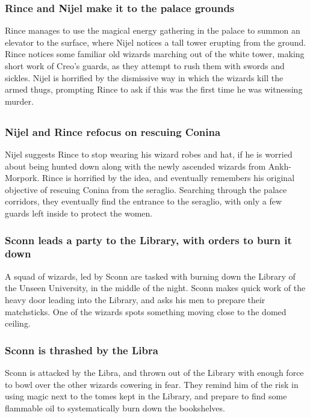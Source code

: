 \subsubsection{\Gls{Rince} and \Gls{Nijel} make it to the palace grounds}
\Gls{Rince} manages to use the magical energy gathering in the palace to summon an elevator to
the surface, where \Gls{Nijel} notices a tall tower erupting from the ground. \Gls{Rince} notices
some familiar old wizards marching out of the white tower, making short work of \Gls{Creo}'s
guards, as they attempt to rush them with swords and sickles. \Gls{Nijel} is horrified by the
dismissive way in which the wizards kill the armed thugs, prompting \Gls{Rince} to ask if this was
the first time he was witnessing murder.

\subsection{}
\subsubsection{\Gls{Nijel} and \Gls{Rince} refocus on rescuing \Gls{Conina}}
\Gls{Nijel} suggests \Gls{Rince} to stop wearing his wizard robes and hat, if he is worried about
being hunted down along with the newly ascended wizards from Ankh-Morpork. \Gls{Rince} is horrified
by the idea, and eventually remembers his original objective of rescuing \Gls{Conina} from the
seraglio. Searching through the palace corridors, they eventually find the entrance to the
seraglio, with only a few guards left inside to protect the women.

\subsubsection{\Gls{Sconn} leads a party to the Library, with orders to burn it down}
A squad of wizards, led by \Gls{Sconn} are tasked with burning down the Library of the Unseen
University, in the middle of the night. \Gls{Sconn} makes quick work of the heavy door leading into
the Library, and asks his men to prepare their matchsticks. One of the wizards spots something
moving close to the domed ceiling.

\subsubsection{\Gls{Sconn} is thrashed by the \Gls{Libra}}
\Gls{Sconn} is attacked by the \Gls{Libra}, and thrown out of the Library with enough force to
bowl over the other wizards cowering in fear. They remind him of the risk in using magic next to
the tomes kept in the Library, and prepare to find some flammable oil to systematically burn down
the bookshelves.

